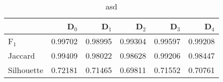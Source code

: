 \begin{table}
\centering
\caption{asd}
\label{tab:s1-cont-eca-single}
\begin{tabular}{lrrrrr}
\toprule
{} &   D$_0$ &   D$_1$ &   D$_2$ &   D$_3$ &   D$_4$ \\
\midrule
F$_1$      & 0.99702 & 0.98995 & 0.99304 & 0.99597 & 0.99208 \\
Jaccard    & 0.99409 & 0.98022 & 0.98628 & 0.99206 & 0.98447 \\
Silhouette & 0.72181 & 0.71465 & 0.69811 & 0.71552 & 0.70761 \\
\bottomrule
\end{tabular}
\end{table}
